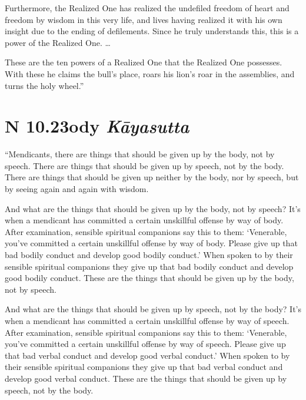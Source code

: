 \documentclass[12pt,openany]{book}%
\newcommand*{\suttatitleacronym}[1]{\smaller[2]{#1}\vspace*{.3em}}
\newcommand*{\suttatitletranslation}[1]{\linebreak{#1}}
\newcommand*{\suttatitleroot}[1]{\linebreak\smaller[2]\itshape{#1}}
\newcommand*{\tocacronym}[1]{\hspace*{-3.3em}{#1}\quad}
\newcommand*{\toctranslation}[1]{#1}
\newcommand*{\tocroot}[1]{(\textit{#1})}
\begin{document}
Furthermore, the Realized One has realized the undefiled freedom of heart and freedom by wisdom in this very life, and lives having realized it with his own insight due to the ending of defilements. Since he truly understands this, this is a power of the Realized One. … 

These are the ten powers of a Realized One that the Realized One possesses. With these he claims the bull’s place, roars his lion’s roar in the assemblies, and turns the holy wheel.” 

%
\section*{{\suttatitleacronym AN 10.23}{\suttatitletranslation Body }{\suttatitleroot Kāyasutta}}
\addcontentsline{toc}{section}{\tocacronym{AN 10.23} \toctranslation{Body } \tocroot{Kāyasutta}}

“Mendicants, there are things that should be given up by the body, not by speech. There are things that should be given up by speech, not by the body. There are things that should be given up neither by the body, nor by speech, but by seeing again and again with wisdom. 

And what are the things that should be given up by the body, not by speech? It’s when a mendicant has committed a certain unskillful offense by way of body. After examination, sensible spiritual companions say this to them: ‘Venerable, you’ve committed a certain unskillful offense by way of body. Please give up that bad bodily conduct and develop good bodily conduct.’ When spoken to by their sensible spiritual companions they give up that bad bodily conduct and develop good bodily conduct. These are the things that should be given up by the body, not by speech. 

And what are the things that should be given up by speech, not by the body? It’s when a mendicant has committed a certain unskillful offense by way of speech. After examination, sensible spiritual companions say this to them: ‘Venerable, you’ve committed a certain unskillful offense by way of speech. Please give up that bad verbal conduct and develop good verbal conduct.’ When spoken to by their sensible spiritual companions they give up that bad verbal conduct and develop good verbal conduct. These are the things that should be given up by speech, not by the body. 
\end{document}
